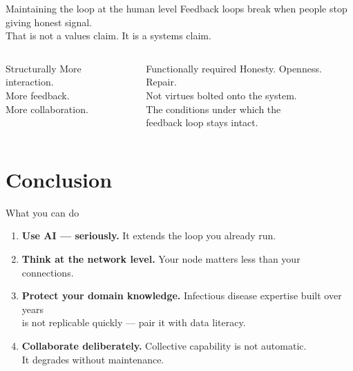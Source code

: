 \documentclass[aspectratio=169, 10pt]{beamer}
\begin{document}
\begin{frame}{Maintaining the loop at the human level}
  Feedback loops break when people stop giving honest signal.\\[0.5em]
  That is not a values claim. It is a systems claim.

  \bigskip
  \begin{columns}[T]
      \begin{block}{Structurally}
        More interaction.\\
        More feedback.\\
        More collaboration.
      \end{block}

      \begin{alertblock}{Functionally required}
        Honesty. Openness. Repair.\\[0.4em]
        \small Not virtues bolted onto the system.\\
        The conditions under which the\\
        feedback loop stays intact.
      \end{alertblock}
  \end{columns}
\end{frame}

\section{Conclusion}

\begin{frame}{What you can do}
  \begin{enumerate}
    \item \textbf{Use AI — seriously.}
          It extends the loop you already run.
    \bigskip
    \item \textbf{Think at the network level.}
          Your node matters less than your connections.
    \bigskip
    \item \textbf{Protect your domain knowledge.}
          Infectious disease expertise built over years\\
          is not replicable quickly — pair it with data literacy.
    \bigskip
    \item \textbf{Collaborate deliberately.}
          Collective capability is not automatic.\\
          It degrades without maintenance.
  \end{enumerate}
\end{frame}
\end{document}
